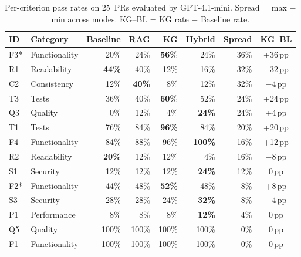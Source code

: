 \begin{table}[t]
\centering
\caption{Per-criterion pass rates on 25~PRs evaluated by GPT-4.1-mini. Spread = max $-$ min across modes. KG--BL = KG rate $-$ Baseline rate.}
\label{tab:per-criterion-gpt}
\begin{tabular}{llrrrrrc}
\toprule
\textbf{ID} & \textbf{Category} & \textbf{Baseline} & \textbf{RAG} & \textbf{KG} & \textbf{Hybrid} & \textbf{Spread} & \textbf{KG--BL} \\
\midrule
F3* & Functionality & 20\% & 24\% & \textbf{56\%} & 24\% & 36\% & +36\,pp \\
R1  & Readability   & \textbf{44\%} & 40\% & 12\% & 16\% & 32\% & $-$32\,pp \\
C2  & Consistency   & 12\% & \textbf{40\%} & 8\% & 12\% & 32\% & $-$4\,pp \\
T3  & Tests         & 36\% & 40\% & \textbf{60\%} & 52\% & 24\% & +24\,pp \\
Q3  & Quality       & 0\% & 12\% & 4\% & \textbf{24\%} & 24\% & +4\,pp \\
T1  & Tests         & 76\% & 84\% & \textbf{96\%} & 84\% & 20\% & +20\,pp \\
F4  & Functionality & 84\% & 88\% & 96\% & \textbf{100\%} & 16\% & +12\,pp \\
R2  & Readability   & \textbf{20\%} & 12\% & 12\% & 4\% & 16\% & $-$8\,pp \\
S1  & Security      & 12\% & 12\% & 12\% & \textbf{24\%} & 12\% & 0\,pp \\
F2* & Functionality & 44\% & 48\% & \textbf{52\%} & 48\% & 8\% & +8\,pp \\
S3  & Security      & 28\% & 28\% & 24\% & \textbf{32\%} & 8\% & $-$4\,pp \\
P1  & Performance   & 8\% & 8\% & 8\% & \textbf{12\%} & 4\% & 0\,pp \\
Q5  & Quality       & 100\% & 100\% & 100\% & 100\% & 0\% & 0\,pp \\
F1  & Functionality & 100\% & 100\% & 100\% & 100\% & 0\% & 0\,pp \\
\bottomrule
\end{tabular}
\end{table}



